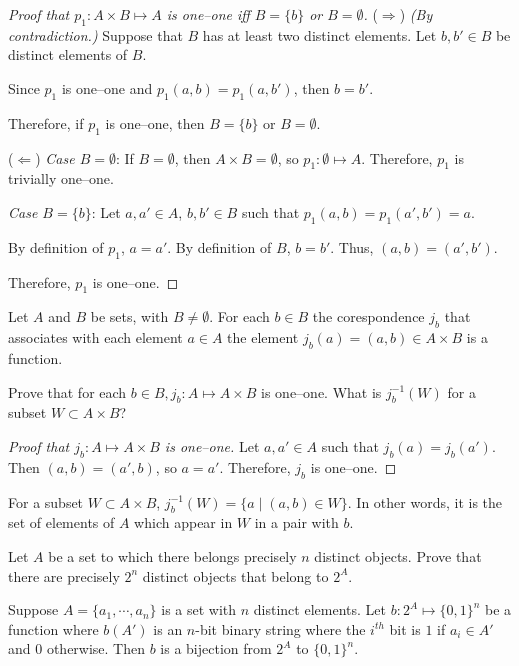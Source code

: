 \begin{proof}[Proof that $p_1 : A \times B \mapsto A$ is one--one iff $B = \{b\}$ or $B = \emptyset$]
	($\Rightarrow$) \textit{(By contradiction.)}
	Suppose that $B$ has at least two distinct elements. Let $b, b' \in B$ be distinct elements of $B$.

	Since $p_1$ is one--one and $p_1(a,b) = p_1(a,b')$, then $b = b'$. \contradiction

	Therefore, if $p_1$ is one--one, then $B = \{b\}$ or $B = \emptyset$.

	($\Leftarrow$) \textit{Case $B = \emptyset$}:
	If $B = \emptyset$, then $A \times B = \emptyset$, so $p_1 : \emptyset \mapsto A$.
	Therefore, $p_1$ is trivially one--one.

	\textit{Case $B = \{b\}$}:
	Let $a,a' \in A$, $b,b' \in B$ such that $p_1(a,b) = p_1(a',b') = a$.

	By definition of $p_1$, $a = a'$. By definition of $B$, $b = b'$.
	Thus, $(a,b) = (a',b')$.

	Therefore, $p_1$ is one--one.
\end{proof}

\begin{problem}
	Let $A$ and $B$ be sets, with $B \neq \emptyset$.
	For each $b \in B$ the corespondence $j_b$ that associates with each element $a \in A$ the element $j_b(a) = (a,b) \in A \times B$ is a function.

	Prove that for each $b \in B, j_b : A \mapsto A \times B$ is one--one.
	What is $j_b^{-1}(W)$ for a subset $W \subset A \times B$?
\end{problem}

\begin{proof}[Proof that $j_b : A \mapsto A \times B$ is one--one]
	Let $a,a' \in A$ such that $j_b(a) = j_b(a')$.
	Then $(a,b) = (a',b)$, so $a = a'$.
	Therefore, $j_b$ is one--one.
\end{proof}

For a subset $W \subset A \times B$, $j_b^{-1}(W) = \{a \mid (a,b) \in W \}$.
In other words, it is the set of elements of $A$ which appear in $W$ in a pair with $b$.

\begin{problem}[8]
	Let $A$ be a set to which there belongs precisely $n$ distinct objects.
	Prove that there are precisely $2^n$ distinct objects that belong to $2^A$.
\end{problem}

\begin{lemma}
	\label{lem:binary_string}
	Suppose $A = \{a_1,\cdots,a_n\}$ is a set with $n$ distinct elements.
	Let $b : 2^A \mapsto \{0,1\}^n$ be a function where $b(A')$ is an $n$-bit binary string where the $i^{th}$ bit is $1$ if $a_i \in A'$ and $0$ otherwise.
	Then $b$ is a bijection from $2^A$ to $\{0,1\}^n$.
\end{lemma}

